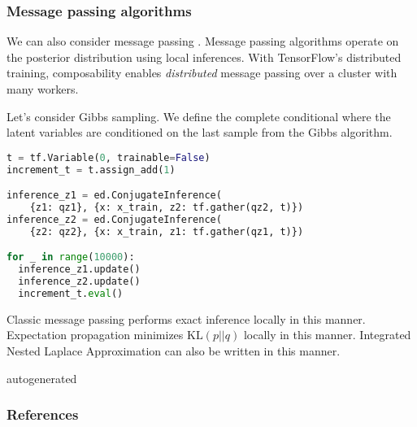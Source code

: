 \subsubsection{Message passing algorithms}

We can also consider message passing \citep{koller2009probabilistic}.
Message passing algorithms operate on the posterior distribution using
local inferences. With TensorFlow's distributed training,
composability enables \emph{distributed} message passing over a
cluster with many workers.

Let's consider Gibbs sampling. We define the complete conditional
where the latent variables are conditioned on the last sample from the
Gibbs algorithm.
\begin{lstlisting}[language=Python]
t = tf.Variable(0, trainable=False)
increment_t = t.assign_add(1)

inference_z1 = ed.ConjugateInference(
    {z1: qz1}, {x: x_train, z2: tf.gather(qz2, t)})
inference_z2 = ed.ConjugateInference(
    {z2: qz2}, {x: x_train, z1: tf.gather(qz1, t)})

for _ in range(10000):
  inference_z1.update()
  inference_z2.update()
  increment_t.eval()
\end{lstlisting}

Classic message passing performs exact inference locally in this
manner. Expectation propagation \citep{minka2001expectation} minimizes
$\text{KL}(p || q)$ locally in this manner. Integrated Nested Laplace
Approximation \citep{rue2009approximate} can also be written in this
manner.

{{autogenerated}}

\subsubsection{References}\label{references}
